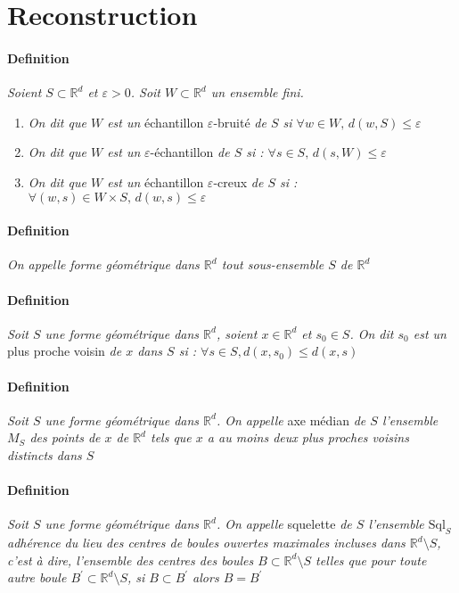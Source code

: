 \documentclass{report}
\newcommand{\R}{\mathbb{R}}
\newcommand{\Sql}{\mathrm{Sql}}
\newcommand{\eps}{\varepsilon}
\begin{document}
\section{Reconstruction}
\paragraph{Definition} \textit{Soient $S \subset \R^d$ et $\eps>0$. Soit $W\subset \R^d$ un ensemble fini.}
\begin{enumerate}
\item \textit{On dit que $W$ est un} échantillon $\eps$-bruité \textit{de $S$ si $\forall w \in W,\, d(w, S) \leq \eps$}
\item \textit{On dit que $W$ est un} $\eps$-échantillon \textit{de $S$ si : $\forall s \in S,\, d(s, W) \leq \eps$}
\item \textit{On dit que $W$ est un} échantillon $\eps$-creux \textit{de $S$ si : $\forall (w, s) \in W\times S,\, d(w, s) \leq \eps$}
\end{enumerate}
\paragraph{Definition} \textit{On appelle} \textit{forme géométrique dans $\R^d$ tout sous-ensemble $S$ de $\R^d$}
\paragraph{Definition} \textit{Soit $S$ une forme géométrique dans $\R^d$, soient $x\in\R^d$ et $s_0\in S$. On dit $s_0$ est un} plus proche voisin \textit{de $x$ dans $S$ si : $\forall s\in S, d(x, s_0) \leq d(x, s)$}
\paragraph{Definition} \textit{Soit $S$ une forme géométrique dans $\R^d$. On appelle} axe médian \textit{de $S$ l'ensemble $M_S$ des points de $x$ de $\R^d$ tels que $x$ a au moins deux plus proches voisins distincts dans $S$}
\paragraph{Definition} \textit{Soit $S$ une forme géométrique dans $\R^d$. On appelle} squelette \textit{de $S$ l'ensemble $\Sql_S$ adhérence du lieu des centres de boules ouvertes maximales incluses dans $\R^d\setminus S$, c'est à dire, l'ensemble des centres des boules $B\subset\R^d\setminus S$ telles que pour toute autre boule $B^\prime\subset\R^d\setminus S$, si $B\subset B^\prime$ alors $B=B^\prime$}
\end{document}
